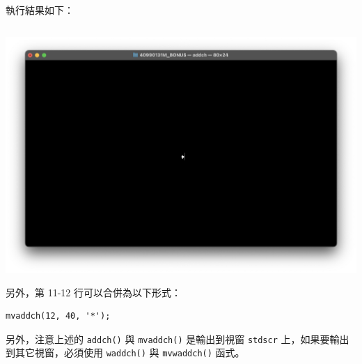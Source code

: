 \documentclass[12pt]{article}
\theoremstyle{definition}
\begin{document}
\newpage
\noindent
執行結果如下：
\begin{lstlisting}[style=zsh]
  % ./addch
\end{lstlisting}
\begin{center}
    \includegraphics[width=\textwidth]{addch.png}
\end{center}
另外，第 11-12 行可以合併為以下形式：
\begin{lstlisting}[style=C*]
  mvaddch(12, 40, '*');
\end{lstlisting}
另外，注意上述的 \texttt{addch()} 與 \texttt{mvaddch()} 是輸出到視窗 \texttt{stdscr} 上，如果要輸出到其它視窗，必須使用 \texttt{waddch()} 與 \texttt{mvwaddch()} 函式。
\end{document}
